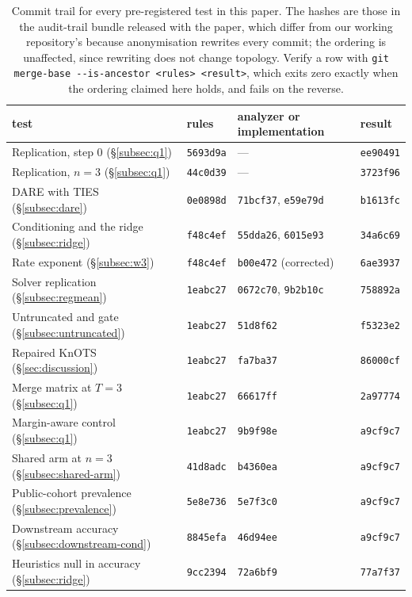 \begin{table}[tb]
\centering
\small
\caption{Commit trail for every pre-registered test in this paper. The hashes
are those in the audit-trail bundle released with the paper, which differ from
our working repository's because anonymisation rewrites every commit; the
ordering is unaffected, since rewriting does not change topology. Verify a row
with \texttt{git merge-base -{}-is-ancestor <rules> <result>}, which exits zero
exactly when the ordering claimed here holds, and fails on the reverse.}
\label{tab:commits}
\begin{tabular}{llll}
\toprule
test & rules & analyzer or implementation & result \\
\midrule
Replication, step 0 (\S\ref{subsec:q1}) & \texttt{5693d9a} &
  --- & \texttt{ee90491} \\
Replication, $n=3$ (\S\ref{subsec:q1}) & \texttt{44c0d39} &
  --- & \texttt{3723f96} \\
DARE with TIES (\S\ref{subsec:dare}) & \texttt{0e0898d} &
  \texttt{71bcf37}, \texttt{e59e79d} & \texttt{b1613fc} \\
Conditioning and the ridge (\S\ref{subsec:ridge}) & \texttt{f48c4ef} &
  \texttt{55dda26}, \texttt{6015e93} & \texttt{34a6c69} \\
Rate exponent (\S\ref{subsec:w3}) & \texttt{f48c4ef} &
  \texttt{b00e472} (corrected) & \texttt{6ae3937} \\
\addlinespace
Solver replication (\S\ref{subsec:regmean}) & \texttt{1eabc27} &
  \texttt{0672c70}, \texttt{9b2b10c} & \texttt{758892a} \\
Untruncated and gate (\S\ref{subsec:untruncated}) & \texttt{1eabc27} &
  \texttt{51d8f62} & \texttt{f5323e2} \\
Repaired KnOTS (\S\ref{sec:discussion}) & \texttt{1eabc27} &
  \texttt{fa7ba37} & \texttt{86000cf} \\
Merge matrix at $T=3$ (\S\ref{subsec:q1}) & \texttt{1eabc27} &
  \texttt{66617ff} & \texttt{2a97774} \\
\addlinespace
Margin-aware control (\S\ref{subsec:q1}) & \texttt{1eabc27} &
  \texttt{9b9f98e} & \texttt{a9cf9c7} \\
Shared arm at $n=3$ (\S\ref{subsec:shared-arm}) & \texttt{41d8adc} &
  \texttt{b4360ea} & \texttt{a9cf9c7} \\
Public-cohort prevalence (\S\ref{subsec:prevalence}) & \texttt{5e8e736} &
  \texttt{5e7f3c0} & \texttt{a9cf9c7} \\
Downstream accuracy (\S\ref{subsec:downstream-cond}) & \texttt{8845efa} &
  \texttt{46d94ee} & \texttt{a9cf9c7} \\
Heuristics null in accuracy (\S\ref{subsec:ridge}) & \texttt{9cc2394} &
  \texttt{72a6bf9} & \texttt{77a7f37} \\
\bottomrule
\end{tabular}
\end{table}

